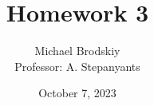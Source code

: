 


\title{Homework 3}
\date{October 7, 2023}
\author{Michael Brodskiy\\ \small Professor: A. Stepanyants}



\maketitle

